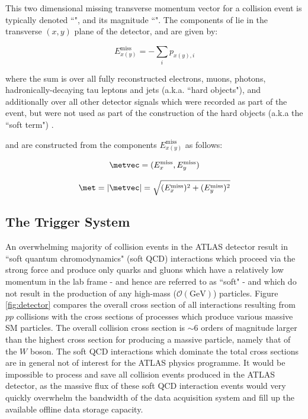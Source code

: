 This two dimensional missing transverse momentum vector for a collision event is typically denoted ``\metvec", and its magnitude ``\met". The components  of \metvec lie in the transverse $(x, y)$ plane of the detector, and are given by:

\begin{equation}
\label{eq:met_components}
E_{x(y)}^\text{miss} = -\sum_i p_{x(y), i}
\end{equation}

\noindent where the sum is over all fully reconstructed electrons, muons, photons, hadronically-decaying tau leptons and jets (a.k.a. ``hard objects"), and additionally over all other detector signals which were recorded as part of the event, but were not used as part of the construction of the hard objects (a.k.a the ``soft term") \cite{met_reconstruction}.

\noindent \metvec and \met are constructed from the components $E^\text{miss}_{x(y)}$ as follows:

\begin{equation}
\label{eq:met_vec}
\metvec = (E^\text{miss}_{x}, E^\text{miss}_{y})
\end{equation}

\begin{equation}
\label{eq:met_mag}
\met = |\metvec| = \sqrt{(E^\text{miss}_{x})^2 + (E^\text{miss}_{y})^2}
\end{equation}

\subsection{The Trigger System}
\label{sec:trigger}

An overwhelming majority of collision events in the ATLAS detector result in ``soft quantum chromodynamics" (soft QCD) interactions which proceed via the strong force and produce only quarks and gluons which have a relatively low momentum in the lab frame - and hence are referred to as ``soft" - and which do not result in the production of any high-mass ($\mathcal{O}(\text{GeV})$) particles. Figure \ref{fig:detector} compares the overall cross section of all interactions resulting from $pp$ collisions with the cross sections of processes which produce various massive SM particles. The overall collision cross section is $\sim$6 orders of magnitude larger than the highest cross section for producing a massive particle, namely that of the $W$ boson. The soft QCD interactions which dominate the total cross sections are in general not of interest for the ATLAS physics programme. It would be impossible to process and save all collision events produced in the ATLAS detector, as the massive flux of these soft QCD interaction events would very quickly overwhelm the bandwidth of the data acquisition system and fill up the available offline data storage capacity. 

